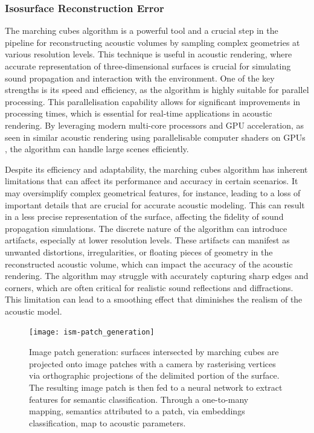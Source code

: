 \subsubsection{Isosurface Reconstruction Error}\label{sec:marching-cubes-error}
The marching cubes algorithm is a powerful tool and a crucial step in the pipeline for reconstructing acoustic volumes by sampling complex geometries at various resolution levels. This technique is useful in acoustic rendering, where accurate representation of three-dimensional surfaces is crucial for simulating sound propagation and interaction with the environment.
One of the key strengths is its speed and efficiency, as the algorithm is highly suitable for parallel processing. This parallelisation capability allows for significant improvements in processing times, which is essential for real-time applications in acoustic rendering. By leveraging modern multi-core processors and GPU acceleration, as seen in similar acoustic rendering using parallelisable computer shaders on GPUs \citep{savioja2010use}, the algorithm can handle large scenes efficiently.\par
Despite its efficiency and adaptability, the marching cubes algorithm has inherent limitations that can affect its performance and accuracy in certain scenarios. It may oversimplify complex geometrical features, for instance, leading to a loss of important details that are crucial for accurate acoustic modeling. This can result in a less precise representation of the surface, affecting the fidelity of sound propagation simulations. The discrete nature of the algorithm can introduce artifacts, especially at lower resolution levels. These artifacts can manifest as unwanted distortions, irregularities, or floating pieces of geometry in the reconstructed acoustic volume, which can impact the accuracy of the acoustic rendering. The algorithm may struggle with accurately capturing sharp edges and corners, which are often critical for realistic sound reflections and diffractions. This limitation can lead to a smoothing effect that diminishes the realism of the acoustic model.\par
\begin{figure}[htb]
    \centering 
    \texttt{[image: ism-patch\_generation]}
    \caption[ISM Acoustic Rendering --- surface patch generation diagram]{Image patch generation: surfaces intersected by marching cubes are projected onto image patches with a camera by rasterising vertices via orthographic projections of the delimited portion of the surface. The resulting image patch is then fed to a neural network to extract features for semantic classification. Through a one-to-many mapping, semantics attributed to a patch, via embeddings classification, map to acoustic parameters.}
\label{fig:ism-patch_generation}
\end{figure}


